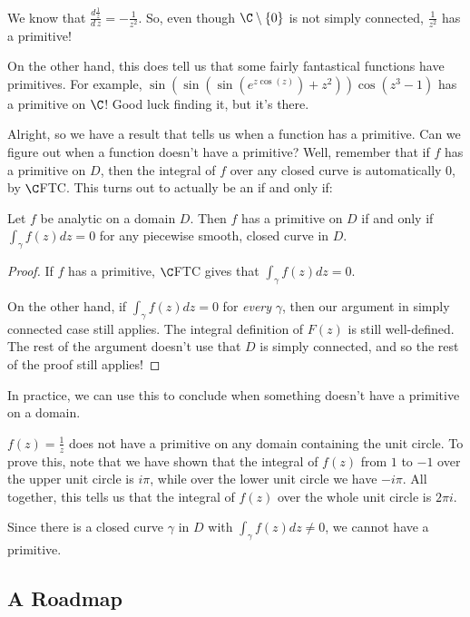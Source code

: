 \begin{ex}{}{} We know that $\frac{d\frac{1}{z}}{d\,z} = -\frac{1}{z^2}$. So, even though $\C\setminus\{0\}$ is not simply connected, $\frac{1}{z^2}$ has a primitive!

On the other hand, this does tell us that some fairly fantastical functions have primitives. For example, $\sin(\sin(\sin(e^{z\cos(z)})+z^2))\cos(z^3 - 1)$ has a primitive on $\C$! Good luck finding it, but it's there.
\end{ex}

Alright, so we have a result that tells us when a function has a primitive. Can we figure out when a function doesn't have a primitive? Well, remember that if $f$ has a primitive on $D$, then the integral of $f$ over any closed curve is automatically $0$, by $\C$FTC. This turns out to actually be an if and only if:

\begin{thmbo}{}{} Let $f$ be analytic on a domain $D$. Then $f$ has a primitive on $D$ if and only if $\int_\gamma f(z)dz = 0$ for any piecewise smooth, closed curve in $D$.\end{thmbo}

\begin{proof} If $f$ has a primitive, $\C$FTC gives that $\int_{\gamma}f(z)dz = 0$.

On the other hand, if $\int_{\gamma}f(z)dz =0$ for {\it every} $\gamma$, then our argument in simply connected case still applies. The integral definition of $F(z)$ is still well-defined. The rest of the argument doesn't use that $D$ is simply connected, and so the rest of the proof still applies!\end{proof}

In practice, we can use this to conclude when something doesn't have a primitive on a domain.

\begin{ex}{}{} $f(z) = \frac{1}{z}$ does not have a primitive on any domain containing the unit circle. To prove this, note that we have shown that the integral of $f(z)$ from $1$ to $-1$ over the upper unit circle is $i\pi$, while over the lower unit circle we have $-i\pi$. All together, this tells us that the integral of $f(z)$ over the whole unit circle is $2\pi i$.

Since there is a closed curve $\gamma$ in $D$ with $\int_{\gamma}f(z)dz \ne 0$, we cannot have a primitive.
\end{ex}

\subsection{A Roadmap}

